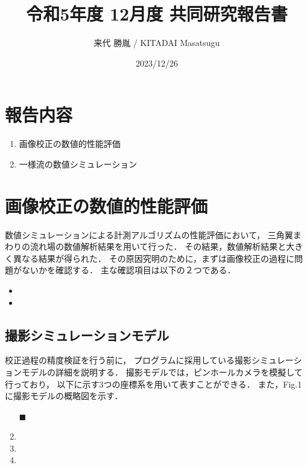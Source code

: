 \documentclass[twocolumn,a4j]{jsarticle}
\author{来代 勝胤 / KITADAI Masatsugu}
\title{令和5年度 12月度 共同研究報告書}
\date{2023/12/26}
\begin{document}
\columnseprule=0.1mm
\maketitle


\section*{報告内容}
\begin{enumerate}[1.]
  \item 画像校正の数値的性能評価
  \item 一様流の数値シミュレーション
\end{enumerate}

\section{画像校正の数値的性能評価}
数値シミュレーションによる計測アルゴリズムの性能評価において，
三角翼まわりの流れ場の数値解析結果を用いて行った．
その結果，数値解析結果と大きく異なる結果が得られた．
その原因究明のために，まずは画像校正の過程に問題がないかを確認する．
主な確認項目は以下の２つである．

\begin{itemize}
  \item {}
  \item {}
\end{itemize}

\subsection{撮影シミュレーションモデル}
校正過程の精度検証を行う前に，
プログラムに採用している撮影シミュレーションモデルの詳細を説明する．
撮影モデルでは，ピンホールカメラを模擬して行っており，
以下に示す3つの座標系を用いて表すことができる．
また，Fig.1 に撮影モデルの概略図を示す．

\begin{enumerate}[(1)]
  \item [$\blacksquare$] 
  \item {}
  \item {}
  \item {}
\end{enumerate}
\end{document}
